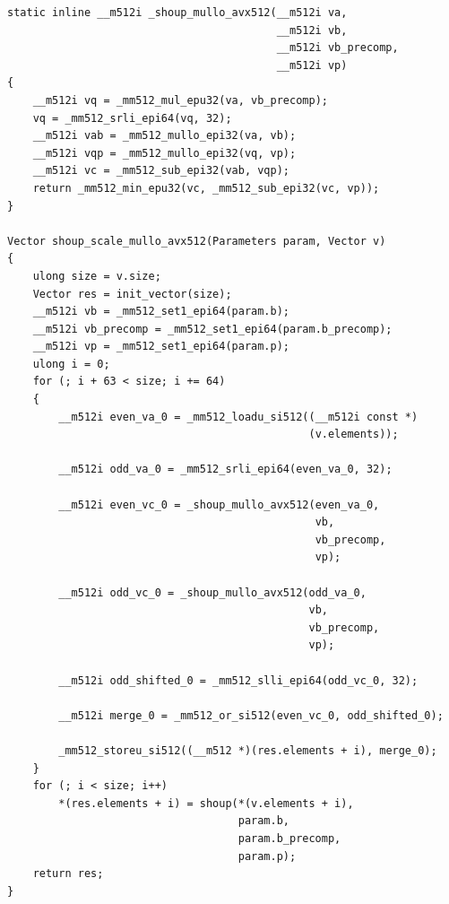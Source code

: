 \documentclass{article}
\begin{document}
\begin{lstlisting}[caption = Variant 2 (AVX512)]
static inline __m512i _shoup_mullo_avx512(__m512i va,
                                          __m512i vb,
                                          __m512i vb_precomp,
                                          __m512i vp)
{
    __m512i vq = _mm512_mul_epu32(va, vb_precomp);
    vq = _mm512_srli_epi64(vq, 32);
    __m512i vab = _mm512_mullo_epi32(va, vb);
    __m512i vqp = _mm512_mullo_epi32(vq, vp);
    __m512i vc = _mm512_sub_epi32(vab, vqp);
    return _mm512_min_epu32(vc, _mm512_sub_epi32(vc, vp));
}

Vector shoup_scale_mullo_avx512(Parameters param, Vector v)
{
    ulong size = v.size;
    Vector res = init_vector(size);
    __m512i vb = _mm512_set1_epi64(param.b);
    __m512i vb_precomp = _mm512_set1_epi64(param.b_precomp);
    __m512i vp = _mm512_set1_epi64(param.p);
    ulong i = 0;
    for (; i + 63 < size; i += 64)
    {
        __m512i even_va_0 = _mm512_loadu_si512((__m512i const *)
                                               (v.elements));

        __m512i odd_va_0 = _mm512_srli_epi64(even_va_0, 32);

        __m512i even_vc_0 = _shoup_mullo_avx512(even_va_0,
                                                vb,
                                                vb_precomp,
                                                vp);

        __m512i odd_vc_0 = _shoup_mullo_avx512(odd_va_0, 
                                               vb,
                                               vb_precomp,
                                               vp);

        __m512i odd_shifted_0 = _mm512_slli_epi64(odd_vc_0, 32);

        __m512i merge_0 = _mm512_or_si512(even_vc_0, odd_shifted_0);

        _mm512_storeu_si512((__m512 *)(res.elements + i), merge_0);
    }
    for (; i < size; i++)
        *(res.elements + i) = shoup(*(v.elements + i),
                                    param.b,
                                    param.b_precomp,
                                    param.p);
    return res;
} 
\end{lstlisting}
\end{document}
